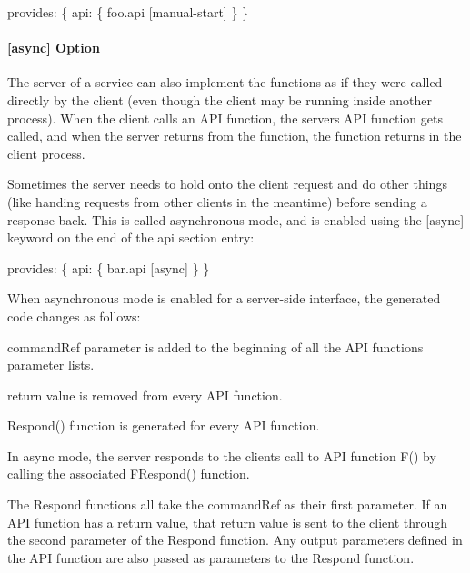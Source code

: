 \begin{DoxyCode}
provides:
\{
    api:
    \{
        foo.api [manual-start]
    \}
\}
\end{DoxyCode}
\hypertarget{def_files_cdef_defFilesCdef_providesApiAsync}{}\paragraph{\mbox{[}async\mbox{]} Option}\label{def_files_cdef_defFilesCdef_providesApiAsync}
The server of a service can also implement the functions as if they were called directly by the client (even though the client may be running inside another process). When the client calls an A\+P\+I function, the server\textquotesingle{}s A\+P\+I function gets called, and when the server returns from the function, the function returns in the client process.

Sometimes the server needs to hold onto the client request and do other things (like handing requests from other clients in the meantime) before sending a response back. This is called asynchronous mode, and is enabled using the {\ttfamily  \mbox{[}async\mbox{]} } keyword on the end of the {\ttfamily api} section entry\+:


\begin{DoxyCode}
provides:
\{
    api:
    \{
        bar.api [async]
    \}
\}
\end{DoxyCode}


When asynchronous mode is enabled for a server-\/side interface, the generated code changes as follows\+:
\begin{DoxyItemize}
\item {\ttfamily command\+Ref} parameter is added to the beginning of all the A\+P\+I functions\textquotesingle{} parameter lists.
\item return value is removed from every A\+P\+I function.
\item {\ttfamily Respond()} function is generated for every A\+P\+I function.
\end{DoxyItemize}

In async mode, the server responds to the client\textquotesingle{}s call to A\+P\+I function {\ttfamily F()} by calling the associated {\ttfamily F\+Respond()} function.

The {\ttfamily Respond} functions all take the {\ttfamily command\+Ref} as their first parameter. If an A\+P\+I function has a return value, that return value is sent to the client through the second parameter of the {\ttfamily Respond} function. Any output parameters defined in the A\+P\+I function are also passed as parameters to the {\ttfamily Respond} function.


